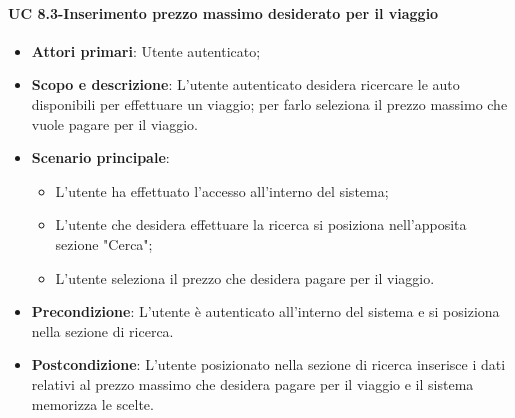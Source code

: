         \paragraph{UC 8.3-Inserimento prezzo massimo desiderato per il viaggio}
       \begin{itemize}
        \item \textbf{Attori primari}: Utente autenticato;
       
        \item \textbf{Scopo e descrizione}: L'utente autenticato desidera ricercare le auto disponibili per effettuare un viaggio; per farlo seleziona il prezzo massimo che vuole pagare per il viaggio.
        \item \textbf{Scenario principale}:
            \begin{itemize}
                \item L'utente ha effettuato l'accesso all'interno del sistema;
                \item L'utente che desidera effettuare la ricerca si posiziona nell'apposita sezione "Cerca";
                \item L'utente seleziona il prezzo che desidera pagare per il viaggio.
            \end{itemize}
        
        \item \textbf{Precondizione}: L'utente è autenticato all'interno del sistema e si posiziona nella sezione di ricerca.
        \item \textbf{Postcondizione}: L'utente posizionato nella sezione di ricerca inserisce i dati relativi al prezzo massimo che desidera pagare per il viaggio e il sistema memorizza le scelte.
        \end{itemize}
        
        
